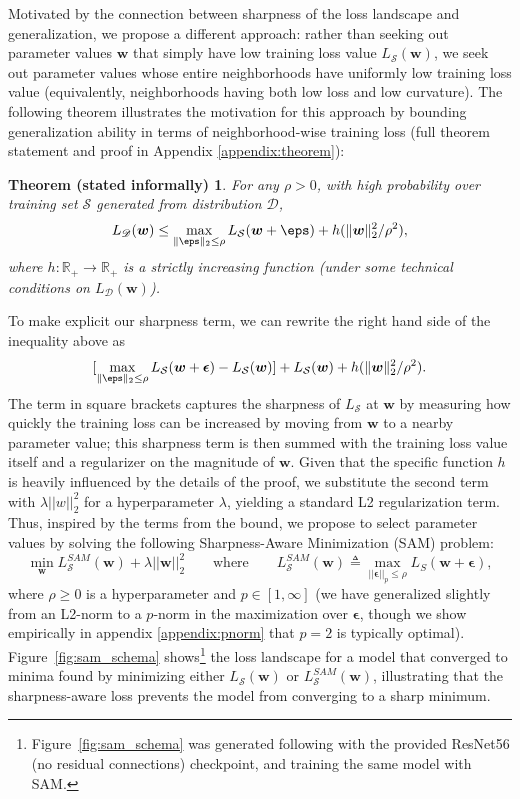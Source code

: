 \documentclass{article} %
\newtheorem{inftheorem}[theorem]{Theorem (stated informally)}
\begin{document}
Motivated by the connection between sharpness of the loss landscape and generalization, we propose a different approach: rather than seeking out parameter values $\boldsymbol{w}$ that simply have low training loss value $L_{\mathcal{S}}(\boldsymbol{w})$, we seek out parameter values whose entire neighborhoods have uniformly low training loss value (equivalently, neighborhoods having both low loss and low curvature).  The following theorem illustrates the motivation for this approach by bounding generalization ability in terms of neighborhood-wise training loss (full theorem statement and proof in Appendix \ref{appendix:theorem}):
\begin{inftheorem} For any $\rho>0$, with high probability over training set $\mathcal{S}$ generated from distribution $\mathscr{D}$,
$$L_\mathscr{D}(\boldsymbol{w}) \leq \max_{\|\boldsymbol{\eps}\|_2 \leq \rho} L_\mathcal{S}(\boldsymbol{w}+\boldsymbol{\eps}) + h(\|\boldsymbol{w}\|_2^2/\rho^2),$$
where $h: \mathbb{R}_{+}\rightarrow  \mathbb{R}_{+}$ is a strictly increasing function (under some technical conditions on $L_\mathscr{D}(\boldsymbol{w})$).
\end{inftheorem}
To make explicit our sharpness term, we can rewrite the right hand side of the inequality above as
$$[\max_{\|\boldsymbol{\eps}\|_2\leq \rho }L_\mathcal{S}(\boldsymbol{w}+\boldsymbol{\epsilon}) - L_\mathcal{S}(\boldsymbol{w})] + L_\mathcal{S}(\boldsymbol{w}) + h(\|\boldsymbol{w}\|_2^2/\rho^2).$$
The term in square brackets captures the sharpness of $L_\mathcal{S}$ at $\boldsymbol{w}$ by measuring how quickly the training loss can be increased by moving from $\boldsymbol{w}$ to a nearby parameter value; this sharpness term is then summed with the training loss value itself and a regularizer on the magnitude of $\boldsymbol{w}$.  Given that the specific function $h$ is heavily influenced by the details of the proof, we substitute the second term with $\lambda ||w||_2^2$ for a hyperparameter $\lambda$, yielding a standard L2 regularization term. Thus, inspired by the terms from the bound, we propose to select parameter values by solving the following Sharpness-Aware Minimization (SAM) problem:
\begin{equation}
\label{sam-loss}
\min_{\boldsymbol{w}} L^{SAM}_\mathcal{S}(\boldsymbol{w}) + \lambda ||\boldsymbol{w}||_2^2 \text{~~~~~~where~~~~~~} L^{SAM}_\mathcal{S}(\boldsymbol{w}) \triangleq \max_{||\boldsymbol{\epsilon}||_p\leq \rho} L_S(\boldsymbol{w}+\boldsymbol{\epsilon}),
\end{equation}
where $\rho \geq 0$ is a hyperparameter and $p \in [1, \infty]$ (we have generalized slightly from an L2-norm to a $p$-norm in the maximization over $\boldsymbol{\epsilon}$, though we show empirically in appendix \ref{appendix:pnorm} that $p=2$ is typically optimal).  Figure~\ref{fig:sam_schema} shows\footnote{
Figure~\ref{fig:sam_schema} was generated following \cite{DBLP:journals/corr/abs-1712-09913} with the provided ResNet56 (no residual connections) checkpoint, and training the same model with SAM.} the loss landscape for a model that converged to minima found by minimizing either $L_\mathcal{S}(\boldsymbol{w})$ or $L^{SAM}_\mathcal{S}(\boldsymbol{w})$, illustrating that the sharpness-aware loss prevents the model from converging to a sharp minimum.
\end{document}
